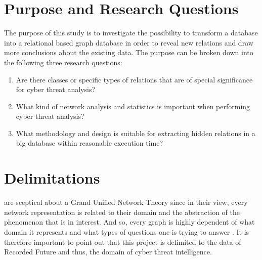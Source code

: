 \section{Purpose and Research Questions}
The purpose of this study is to investigate the possibility to transform a database into a relational based graph database in order to reveal new relations and draw more conclusions about the existing data. The purpose can be broken down into the following three research questions:
\begin{enumerate}
	\item Are there classes or specific types of relations that are of special significance for cyber threat analysis?
    \item What kind of network analysis and statistics is important when performing cyber threat analysis?
    \item What methodology and design is suitable for extracting hidden relations in a big database within reasonable execution time?
\end{enumerate}

\section{Delimitations}
\citet{brandes2013} are sceptical about a Grand Unified Network Theory since in their view, every network representation is related to their domain and the abstraction of the phenomenon that is in interest. And so, every graph is highly dependent of what domain it represents and what types of questions one is trying to answer \cite{hendrix2010, schroeder2007}. It is therefore important to point out that this project is delimited to the data of Recorded Future and thus, the domain of cyber threat intelligence. 

